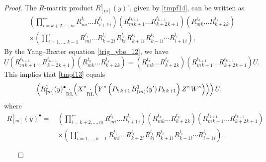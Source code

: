 \documentclass[12pt,a4paper,reqno]{amsart}
\theoremstyle{stil}
\theoremstyle{defi}
\theoremstyle{defi}
\theoremstyle{stil}
\theoremstyle{stil}
\theoremstyle{stil}
\theoremstyle{prim}
\newenvironment{prf}{\noindent \textit{Proof.}}{\null\hfill$\qed$\hskip
2mm\vskip 2mm}
\newcommand{\beq}{\begin{equation}}
\newcommand{\eeq}{\end{equation}}
\newcommand{\ts}{\hspace{1pt}}
\newcommand{\cdotrl}{\mathop{\hspace{-2pt}\underset{\text{RL}}{\cdot}\hspace{-2pt}}}
\begin{document}
\begin{prf}
The $R$-matrix product  $R_{[m]}^1 (y)^\circ $, given by \eqref{tmpf14}, can be written as
\begin{align*}
&\left(\prod_{i=k+2,\ldots ,m }^{\longleftarrow}
 R_{m i}^{t_i}  \ldots 
 R_{i+1\ts i}^{t_i}\right)
 \left(R_{m \ts k+1}^{t_{k+1}}  \ldots 
 R_{k+2\ts k+1}^{t_{k+1}} \right)
\left(R_{m k}^{t_k}  \ldots 
 R_{k+2\ts k}^{t_k} \right)
\\
&\times
\left(\prod_{i=1,\ldots ,k-1 }^{\longleftarrow}
 R_{m i}^{t_i}  \ldots R_{k+2 i}^{t_i} \ts 
R_{k  i}^{t_i} \ts R_{k+1 i}^{t_i} \ts
R_{k-1 i}^{t_i} \cdots
 R_{i+1\ts i}^{t_i}\right),
\end{align*}
By the Yang--Baxter equation \eqref{trig_ybe_12}, we have
$$
U\left(R_{m \ts k+1}^{t_{k+1}}  \ldots 
 R_{k+2\ts k+1}^{t_{k+1}} \right)
\left(R_{m k}^{t_k}  \ldots 
 R_{k+2\ts k}^{t_k} \right) =
\left(R_{m k}^{t_k}  \ldots 
 R_{k+2\ts k}^{t_k} \right)
\left(R_{m \ts k+1}^{t_{k+1}}  \ldots 
 R_{k+2\ts k+1}^{t_{k+1}} \right)
 U.
$$
This implies that \eqref{tmpf13} equals
\beq\label{tmpf16}
	\left(R_{[m]}^1 (y)^\bullet \cdotrl 
\left(X^\circ \cdotrl\left(
 Y^\circ   \left(P_{k\ts k+1}\ts
B_{(m)}^1(y^\prime)\ts
P_{k\ts k+1}\right)    Z^\circ  \ts W^\circ  \right) 
\right)\right) U,
\eeq
where
\begin{align*}
R_{[m]}^1 (y)^\bullet=\,
&\left(\prod_{i=k+2,\ldots ,m }^{\longleftarrow}
 R_{m i}^{t_i}  \ldots 
 R_{i+1\ts i}^{t_i}\right)
\left(R_{m k}^{t_k}  \ldots 
 R_{k+2\ts k}^{t_k} \right)
\left(R_{m \ts k+1}^{t_{k+1}}  \ldots 
 R_{k+2\ts k+1}^{t_{k+1}} \right)
\\
&\times
\left(\prod_{i=1,\ldots ,k-1 }^{\longleftarrow}
 R_{m i}^{t_i}  \ldots R_{k+2 i}^{t_i} \ts 
R_{k  i}^{t_i} \ts R_{k+1 i}^{t_i} \ts
R_{k-1 i}^{t_i} \cdots
 R_{i+1\ts i}^{t_i}\right).
\end{align*}








\end{prf}
\end{document}
